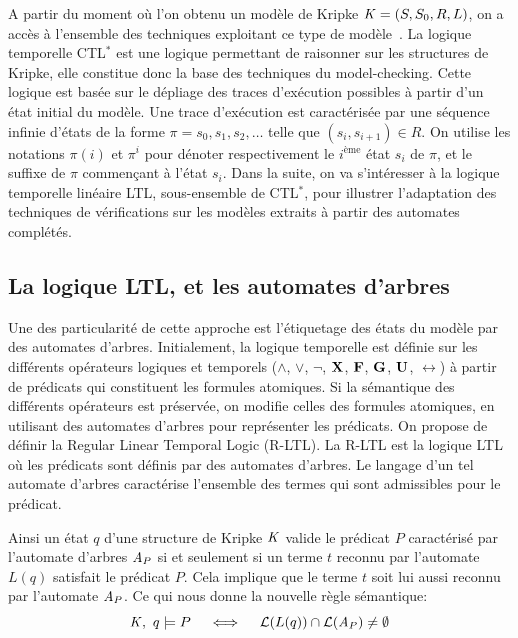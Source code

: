 A partir du moment où l'on obtenu un modèle de Kripke $\mathit K = (S, S_0,
R, L)$, on a accès à l'ensemble des techniques exploitant ce type de
modèle~\cite{MC-Book}. La logique temporelle CTL$^*$ est une logique permettant
de raisonner sur les structures de Kripke, elle constitue donc la base des techniques
du model-checking. Cette logique est basée sur le dépliage des traces
d'exécution possibles à partir d'un état initial du modèle. Une trace
d'exécution est caractérisée par une séquence infinie d'états de la
forme $\pi = s_0, s_1, s_2, \dots$ telle que $(s_i, s_{i+1}) \in
R$. On utilise les notations $\pi(i)$ et $\pi^i$ pour dénoter respectivement
le $i^\text{ème}$ état $s_i$ de $\pi$, et le suffixe de $\pi$ commençant à l'état $s_i$.
Dans la suite, on va s'intéresser à la logique temporelle linéaire LTL, sous-ensemble de CTL$^*$,
pour illustrer l'adaptation des techniques de vérifications sur les modèles extraits à partir 
des automates complétés.


\subsection{La logique LTL, et les automates d'arbres}

Une des particularité de cette approche est l'étiquetage des états du modèle par des automates d'arbres.
Initialement, la logique temporelle est définie sur les différents opérateurs logiques et temporels
($\land$, $\lor$, $\neg$, $\mathbf X$, $\mathbf F$, $\mathbf G$, $\mathbf U$, $\rel$) à partir de prédicats qui constituent 
les formules atomiques. Si la sémantique des différents opérateurs est préservée, on modifie celles des
formules atomiques, en utilisant des automates d'arbres pour représenter les prédicats.
On propose de définir la Regular Linear Temporal Logic (R-LTL). La R-LTL est la logique LTL où les prédicats sont définis par des
automates d'arbres. Le langage d'un tel automate d'arbres caractérise l'ensemble des termes qui sont admissibles pour le prédicat.

Ainsi un état $q$ d'une structure de Kripke $\mathit K$ valide le prédicat $P$ caractérisé
par l'automate d'arbres  $\mathit A_P$ si et seulement si un terme $t$ reconnu par l'automate
$L(q)$ satisfait le prédicat $P$. Cela implique que le terme $t$ soit lui aussi reconnu
par l'automate $\mathit A_P$. Ce qui nous donne la nouvelle règle sémantique:
\[\mathit K,\ q \models P\quad \; \Longleftrightarrow \;\quad \mathcal{L}{}(L(q)) \cap \mathcal{L}{}(\mathit A_P) \neq \emptyset\]

